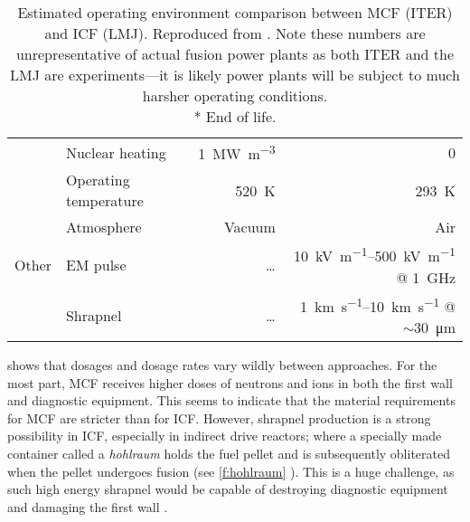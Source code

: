 \begin{table}
{\begin{tabular}{llrr}
                                             & Nuclear heating         & \SI{1}{\mega\watt.m^{-3}}    & 0                                                                                       \\
                                             & Operating temperature   & \SI{520}{\kelvin}            & \SI{293}{\kelvin}                                                                       \\
                                             & Atmosphere              & Vacuum                       & Air                                                                                     \\
            \midrule
            Other                            & EM pulse                & \ldots                       & \SIrange[range-units = single]{10}{500}{\kilo\volt.m^{-1}} @ \SI{1}{\giga\hertz}        \\
                                             & Shrapnel                & \ldots                       & \SIrange[range-units = single]{1}{10}{\kilo\metre.s^{-1}} @ $\sim$\SI{30}{\micro\metre} \\
            \bottomrule
        \end{tabular}
    }
    \caption[Estimated operating conditions of MCF and ICF fusion reactors.]{Estimated operating environment comparison between MCF (ITER) and ICF (LMJ). Reproduced from \cite{openv}. Note these numbers are unrepresentative of actual fusion power plants as both ITER and the LMJ are experiments---it is likely power plants will be subject to much harsher operating conditions. \\* End of life.}
    \label{tab:rad}
\end{table}

 shows that dosages and dosage rates vary wildly between approaches. For the most part, MCF receives higher doses of neutrons and ions in both the first wall and diagnostic equipment. This seems to indicate that the material requirements for MCF are stricter than for ICF. However, shrapnel production is a strong possibility in ICF, especially in indirect drive reactors; where a specially made container called a \emph{hohlraum} holds the fuel pellet and is subsequently obliterated when the pellet undergoes fusion (see \cref{f:hohlraum} \cite{hohlraum}). This is a huge challenge, as such high energy shrapnel would be capable of destroying diagnostic equipment and damaging the first wall \cite{icfpwr1,icfpwr2,icfpwr3}.

